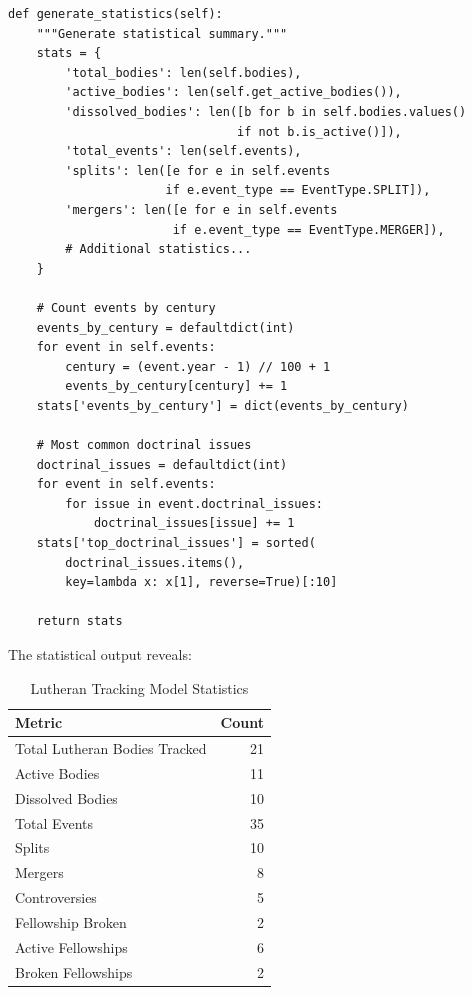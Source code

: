 \begin{verbatim}
def generate_statistics(self):
    """Generate statistical summary."""
    stats = {
        'total_bodies': len(self.bodies),
        'active_bodies': len(self.get_active_bodies()),
        'dissolved_bodies': len([b for b in self.bodies.values()
                                if not b.is_active()]),
        'total_events': len(self.events),
        'splits': len([e for e in self.events
                      if e.event_type == EventType.SPLIT]),
        'mergers': len([e for e in self.events
                       if e.event_type == EventType.MERGER]),
        # Additional statistics...
    }

    # Count events by century
    events_by_century = defaultdict(int)
    for event in self.events:
        century = (event.year - 1) // 100 + 1
        events_by_century[century] += 1
    stats['events_by_century'] = dict(events_by_century)

    # Most common doctrinal issues
    doctrinal_issues = defaultdict(int)
    for event in self.events:
        for issue in event.doctrinal_issues:
            doctrinal_issues[issue] += 1
    stats['top_doctrinal_issues'] = sorted(
        doctrinal_issues.items(),
        key=lambda x: x[1], reverse=True)[:10]

    return stats
\end{verbatim}

The statistical output reveals:

\begin{table}[h]
\centering
\begin{tabular}{lr}
\hline
\textbf{Metric} & \textbf{Count} \\
\hline
Total Lutheran Bodies Tracked & 21 \\
Active Bodies & 11 \\
Dissolved Bodies & 10 \\
Total Events & 35 \\
\quad Splits & 10 \\
\quad Mergers & 8 \\
\quad Controversies & 5 \\
\quad Fellowship Broken & 2 \\
Active Fellowships & 6 \\
Broken Fellowships & 2 \\
\hline
\end{tabular}
\caption{Lutheran Tracking Model Statistics}
\label{tab:lutheran_stats}
\end{table}

